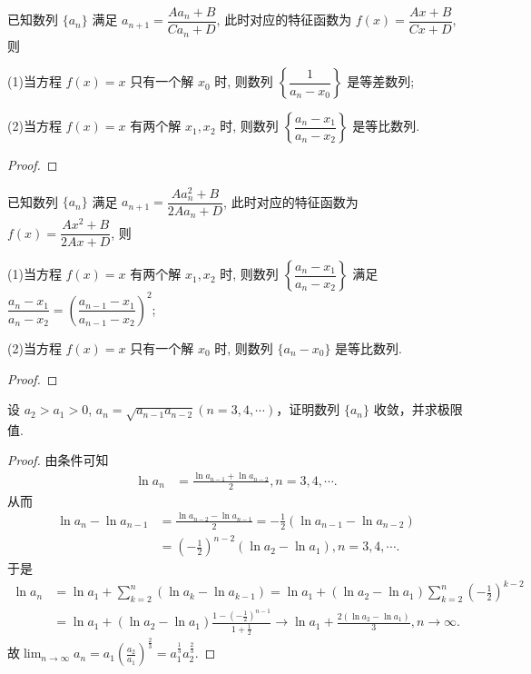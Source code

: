 \documentclass[../../main.tex]{subfiles}
\begin{document}
\begin{proposition}\label{proposition:可直接求通项--类型三}
已知数列 $\{a_n\}$ 满足 $a_{n + 1} = \dfrac{A a_n + B}{C a_n + D}$, 此时对应的特征函数为 $f(x) = \dfrac{A x + B}{C x + D}$, 则

(1)当方程 $f(x) = x$ 只有一个解 $x_0$ 时, 则数列 $\left\{ \dfrac{1}{a_n - x_0} \right\}$ 是等差数列; 

(2)当方程 $f(x) = x$ 有两个解 $x_1, x_2$ 时, 则数列 $\left\{ \dfrac{a_n - x_1}{a_n - x_2} \right\}$ 是等比数列.
\end{proposition}
\begin{proof}


\end{proof}

\begin{proposition}\label{proposition:可直接求通项--类型四}
已知数列 $\{a_n\}$ 满足 $a_{n + 1} = \dfrac{A a_n^2 + B}{2 A a_n + D}$, 此时对应的特征函数为 $f(x) = \dfrac{A x^2 + B}{2 A x + D}$, 则

(1)当方程 $f(x) = x$ 有两个解 $x_1, x_2$ 时, 则数列 $\left\{ \dfrac{a_n - x_1}{a_n - x_2} \right\}$ 满足 $\dfrac{a_n - x_1}{a_n - x_2} = \left( \dfrac{a_{n - 1} - x_1}{a_{n - 1} - x_2} \right)^2$; 

(2)当方程 $f(x) = x$ 只有一个解 $x_0$ 时, 则数列 $\{a_n - x_0\}$ 是等比数列.
\end{proposition}
\begin{proof}


\end{proof}



\begin{example}
设 $a_2 > a_1 > 0$, $a_n = \sqrt{a_{n - 1}a_{n - 2}}(n = 3, 4, \cdots)$，证明数列 $\{a_n\}$ 收敛，并求极限值.
\end{example}
\begin{proof}
由条件可知
\begin{align*}
\ln a_n&=\frac{\ln a_{n-1}+\ln a_{n-2}}{2},n=3,4,\cdots .
\end{align*}
从而
\begin{align*}
\ln a_n-\ln a_{n-1}&=\frac{\ln a_{n-2}-\ln a_{n-1}}{2}=-\frac{1}{2}\left( \ln a_{n-1}-\ln a_{n-2} \right) 
\\
&=\left( -\frac{1}{2} \right) ^{n-2}\left( \ln a_2-\ln a_1 \right) ,n=3,4,\cdots .
\end{align*}
于是
\begin{align*}
\ln a_n&=\ln a_1+\sum_{k=2}^n{\left( \ln a_k-\ln a_{k-1} \right)}=\ln a_1+\left( \ln a_2-\ln a_1 \right) \sum_{k=2}^n{\left( -\frac{1}{2} \right) ^{k-2}}
\\
&=\ln a_1+\left( \ln a_2-\ln a_1 \right) \frac{1-\left( -\frac{1}{2} \right) ^{n-1}}{1+\frac{1}{2}}\rightarrow \ln a_1+\frac{2\left( \ln a_2-\ln a_1 \right)}{3},n\rightarrow \infty .
\end{align*}
故$\lim_{n\rightarrow \infty}a_n=a_1\left( \frac{a_2}{a_1} \right) ^{\frac{2}{3}}=a_{1}^{\frac{1}{3}}a_{2}^{\frac{2}{3}}.$

\end{proof}
\end{document}
